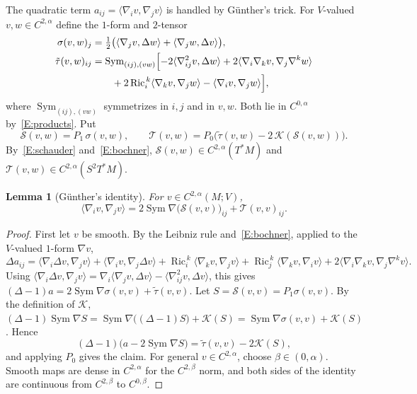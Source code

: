 \documentclass[11pt]{amsart}
\newtheorem{lemma}[theorem]{Lemma}
\theoremstyle{definition}
\newcommand{\Sym}{\operatorname{Sym}}
\newcommand{\Ric}{\operatorname{Ric}}
\newcommand{\inner}[2]{\langle #1, #2\rangle}
\newcommand{\cS}{\mathcal{S}}
\newcommand{\cT}{\mathcal{T}}
\newcommand{\cK}{\mathcal{K}}
\begin{document}
The quadratic term $a_{ij}=\inner{\nabla_iv}{\nabla_jv}$ is handled by G\"unther's trick. For
$V$-valued $v,w\in C^{2,\alpha}$ define the $1$-form and $2$-tensor
\begin{align*}
\sigma(v,w)_j &= \tfrac12\bigl(\inner{\nabla_jv}{\Delta w}+\inner{\nabla_jw}{\Delta v}\bigr),\\
\tilde\tau(v,w)_{ij} &= \Sym_{(ij),(vw)}\Bigl[-2\inner{\nabla^2_{ij}v}{\Delta w}
  + 2\inner{\nabla_i\nabla_kv}{\nabla_j\nabla^kw}\\
  &\qquad + 2\Ric_i^{\,k}\inner{\nabla_kv}{\nabla_jw} - \inner{\nabla_iv}{\nabla_jw}\Bigr],
\end{align*}
where $\Sym_{(ij),(vw)}$ symmetrizes in $i,j$ and in $v,w$. Both lie in $C^{0,\alpha}$
by~\ref{E:products}. Put
\begin{equation}\label{eq:S-T}
\cS(v,w) = P_1\,\sigma(v,w),\qquad
\cT(v,w) = P_0\bigl(\tilde\tau(v,w) - 2\,\cK(\cS(v,w))\bigr).
\end{equation}
By~\ref{E:schauder} and~\ref{E:bochner}, $\cS(v,w)\in C^{2,\alpha}(T^*M)$ and
$\cT(v,w)\in C^{2,\alpha}(S^2T^*M)$.

\begin{lemma}[G\"unther's identity]\label{lem:gunther-identity}
For $v\in C^{2,\alpha}(M;V)$,
\[
\inner{\nabla_iv}{\nabla_jv} = 2\Sym\nabla\bigl(\cS(v,v)\bigr)_{ij} + \cT(v,v)_{ij}.
\]
\end{lemma}

\begin{proof}
First let $v$ be smooth. By the Leibniz rule and~\ref{E:bochner}, applied to the $V$-valued
$1$-form $\nabla v$,
\[
\Delta a_{ij} = \inner{\nabla_i\Delta v}{\nabla_jv}+\inner{\nabla_iv}{\nabla_j\Delta v}
+\Ric_i^{\,k}\inner{\nabla_kv}{\nabla_jv}+\Ric_j^{\,k}\inner{\nabla_kv}{\nabla_iv}
+2\inner{\nabla_i\nabla_kv}{\nabla_j\nabla^kv}.
\]
Using $\inner{\nabla_i\Delta v}{\nabla_jv}=\nabla_i\inner{\nabla_jv}{\Delta v}
-\inner{\nabla^2_{ij}v}{\Delta v}$, this gives
$(\Delta-1)a = 2\Sym\nabla\sigma(v,v)+\tilde\tau(v,v)$. Let $S=\cS(v,v)=P_1\sigma(v,v)$. By the
definition of $\cK$, $(\Delta-1)\Sym\nabla S=\Sym\nabla\bigl((\Delta-1)S\bigr)+\cK(S)
=\Sym\nabla\sigma(v,v)+\cK(S)$. Hence
\[
(\Delta-1)\bigl(a-2\Sym\nabla S\bigr) = \tilde\tau(v,v)-2\cK(S),
\]
and applying $P_0$ gives the claim. For general $v\in C^{2,\alpha}$, choose $\beta\in(0,\alpha)$.
Smooth maps are dense in $C^{2,\alpha}$ for the $C^{2,\beta}$ norm, and both sides of the identity
are continuous from $C^{2,\beta}$ to $C^{0,\beta}$.
\end{proof}
\end{document}
